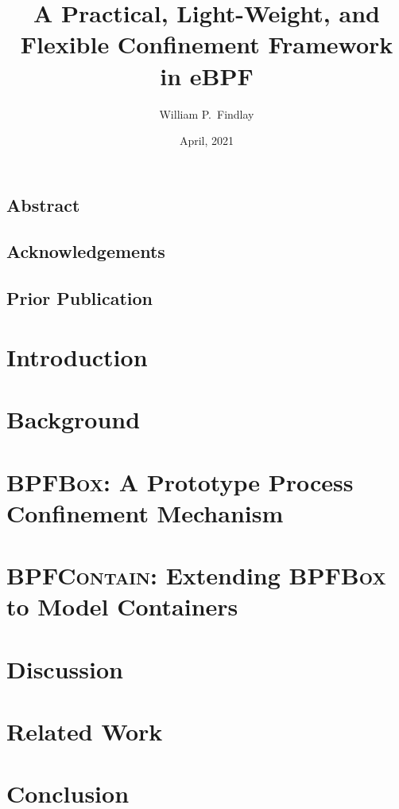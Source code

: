\documentclass[
  fontsize=12pt,
  paper=letter,
  twoside,
  cleardoublepage=plain,
]{scrbook}
\title{A Practical, Light-Weight, and Flexible Confinement Framework in eBPF}
\author{William P.~Findlay}
\date{April, 2021}
\newcommand{\bpfbox}{\textsc{BPFBox}}
\newcommand{\bpfcontain}{\textsc{BPFContain}}
\begin{document}



\frontmatter%

\section*{Abstract}
\cleardoublepage%

\section*{Acknowledgements}
\cleardoublepage%

\section*{Prior Publication}
\cleardoublepage%

\begingroup
\hypersetup{linkcolor=black}
\tableofcontents
\listoffigures
\listoftables
\endgroup

\mainmatter%


\chapter{Introduction}%
\label{c:introduction}


\chapter{Background}%
\label{c:background}


\chapter{\bpfbox: A Prototype Process Confinement Mechanism}%
\label{c:bpfbox}


\chapter{\bpfcontain: Extending \bpfbox{} to Model Containers}%
\label{c:bpfcontain}


\chapter{Discussion}%
\label{c:discussion}


\chapter{Related Work}%
\label{c:related}


\chapter{Conclusion}%
\label{c:conclusion}


\cleardoublepage%
\printbibliography
\nocite{*}
\end{document}
